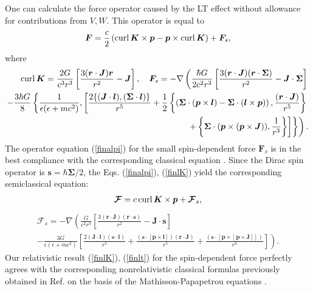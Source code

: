 \documentclass[preprint,showpacs,preprintnumbers,amsmath,amssymb]{revtex4}
\begin{document}
One can calculate the force operator caused by the LT effect
without allowance for contributions from $V,W$. This operator is
equal to
\begin{eqnarray}
\bm F=\frac c2 \left({\rm curl}\,\bm K\times\bm p-\bm p\times
{\rm curl}\,\bm K\right)+\bm F_s,\label{finalpi}
\end{eqnarray}
where
\begin{eqnarray}
{\rm curl}\,\bm K=\frac{2G}{c^3r^3} \left[\frac{3(\bm r\cdot
\bm J)\bm r} {r^2} - \bm J\right],\quad %
\bm F_s=-\nabla\left(\frac{\hbar G}{2c^2r^3} \left[\frac{3(\bm
r\cdot\bm J)(\bm r\cdot\bm \Sigma)}{r^2}- \bm J\cdot\bm
\Sigma\right]\right.\nonumber\\-\frac{3\hbar G }{8}\left\{\frac
{1}{\epsilon(\epsilon+mc^2)},\left[\frac{2\{(\bm J\cdot\bm l),
(\bm \Sigma\cdot\bm l)\}}{r^5}+\frac{1}{2} \left\{\left(\bm\Sigma
\cdot (\bm p\times\bm l)-\bm \Sigma\cdot(\bm l\times\bm p)\right),
\frac {(\bm r\cdot\bm J)}{r^5}\right\}\right.\right.\nonumber\\
\left.\left.\left. +\left\{\bm \Sigma\cdot(\bm p\times(\bm
p\times\bm J)), \frac{1}{r^3}\right\}\right]\right\}\right).
\label{finlK}
\end{eqnarray}
The operator equation (\ref{finalpi}) for the small spin-dependent
force $\bm F_s$ is in the best compliance with the corresponding
classical equation \cite{LL}. Since the Dirac spin operator is
$\bm s=\hbar\bm \Sigma/2$, the Eqs. (\ref{finalpi}), (\ref{finlK})
yield the corresponding semiclassical equation:
\begin{eqnarray}
\bm{\mathcal{F}}=c\,{\rm curl}\,\bm K\times\bm
p+\bm{\mathcal{F}}_s,\label{finalpt}
\end{eqnarray}
\begin{eqnarray}
\bm{\mathcal{F}}_s=-\nabla\left(\frac{G}{c^2r^3} \left[\frac{3(\bm
r\cdot\bm J)(\bm r\cdot\bm s)}{r^2}- \bm J\cdot\bm s\right]\right.\nonumber\\
\left.-\frac{3G}{\epsilon(\epsilon+mc^2)}\left[\frac{2(\bm J\cdot\bm l)(\bm
s\cdot\bm l)}{r^5}+\frac{\left(\bm s \cdot [\bm p\times\bm l]\right)
(\bm r\cdot\bm J)}{r^5} + \frac{\left(\bm s \cdot [\bm p\times[\bm
p\times\bm J]]\right)}{r^3}\right]\right). \label{finlt}
\end{eqnarray}
Our relativistic result (\ref{finlK}), (\ref{finlt}) for the
spin-dependent force perfectly agrees with the corresponding
nonrelativistic classical formulas previously obtained in Ref.
\cite{wald} on the basis of the Mathisson-Papapetrou equations
\cite{Mathisson,Papapetrou}.
\end{document}
